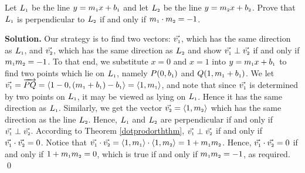 \begin{ex}\label{perpendicularlines2} Let $L_{\mbox{\tiny$1$}}$ be the line $y = m_{\mbox{\tiny$1$}}x + b_{\mbox{\tiny$1$}}$ and let $L_{\mbox{\tiny$2$}}$ be the line $y = m_{\mbox{\tiny$2$}}x + b_{\mbox{\tiny$2$}}$.  Prove that $L_{\mbox{\tiny$1$}}$ is perpendicular to $L_{\mbox{\tiny$2$}}$ if and only if $m_{\mbox{\tiny$1$}} \cdot m_{\mbox{\tiny$2$}} = -1$.

\smallskip

{\bf Solution.}  Our strategy is to find two vectors: $\vec{v_{\mbox{\tiny$1$}}}$, which has the same direction as $L_{\mbox{\tiny$1$}}$,  and $\vec{v_{\mbox{\tiny$2$}}}$, which has the same direction as $L_{\mbox{\tiny$2$}}$ and show $\vec{v_{\mbox{\tiny$1$}}} \perp \vec{v_{\mbox{\tiny$2$}}}$ if and only if $ m_{\mbox{\tiny$1$}}  m_{\mbox{\tiny$2$}} = -1$.  To that end, we substitute $x=0$ and $x=1$ into $y = m_{\mbox{\tiny$1$}}x + b_{\mbox{\tiny$1$}}$  to find two points which lie on $L_{\mbox{\tiny$1$}}$, namely $P(0,  b_{\mbox{\tiny$1$}})$ and $Q(1, m_{\mbox{\tiny$1$}} + b_{\mbox{\tiny$1$}})$.  We let $\vec{v_{\mbox{\tiny$1$}}} = \overrightarrow{PQ} = \left<1-0,(m_{\mbox{\tiny$1$}}+b_{\mbox{\tiny$1$}}) - b_{\mbox{\tiny$1$}}\right>=\left<1,m_{\mbox{\tiny$1$}}\right>$, and note that since  $\vec{v_{\mbox{\tiny$1$}}}$ is determined by two points on $L_{\mbox{\tiny$1$}}$, it may be viewed as lying on $L_{\mbox{\tiny$1$}}$.  Hence it has the same direction as $L_{\mbox{\tiny$1$}}$. Similarly, we get the vector  $\vec{v_{\mbox{\tiny$2$}}} = \left<1,m_{\mbox{\tiny$2$}}\right>$ which has the same direction as the line 
$L_{\mbox{\tiny$2$}}$.  Hence, $L_{\mbox{\tiny$1$}}$ and $L_{\mbox{\tiny$2$}}$ are perpendicular if and only if $\vec{v_{\mbox{\tiny$1$}}} \perp \vec{v_{\mbox{\tiny$2$}}}$. According to Theorem \ref{dotprodorththm}, $\vec{v_{\mbox{\tiny$1$}}} \perp \vec{v_{\mbox{\tiny$2$}}}$ if and only if $\vec{v_{\mbox{\tiny$1$}}} \cdot \vec{v_{\mbox{\tiny$2$}}} = 0$.  Notice that $\vec{v_{\mbox{\tiny$1$}}} \cdot \vec{v_{\mbox{\tiny$2$}}} = \left<1,m_{\mbox{\tiny$1$}}\right> \cdot \left<1,m_{\mbox{\tiny$2$}}\right> = 1 + m_{\mbox{\tiny$1$}}m_{\mbox{\tiny$2$}}$.  Hence,  $\vec{v_{\mbox{\tiny$1$}}} \cdot \vec{v_{\mbox{\tiny$2$}}} = 0$ if and only if $1 + m_{\mbox{\tiny$1$}}m_{\mbox{\tiny$2$}}  =0$, which is true if and only if $ m_{\mbox{\tiny$1$}}  m_{\mbox{\tiny$2$}} = -1$, as required. \qed

\end{ex}

